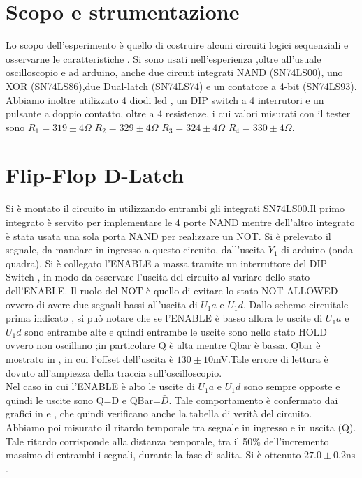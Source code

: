 \section{Scopo e strumentazione}
Lo scopo dell'esperimento è quello di costruire alcuni circuiti logici sequenziali e osservarne le caratteristiche . Si sono usati nell'esperienza ,oltre all'usuale oscilloscopio e ad arduino, anche due circuit integrati NAND (SN74LS00), uno XOR (SN74LS86),due Dual-latch (SN74LS74) e un contatore a 4-bit (SN74LS93). Abbiamo inoltre utilizzato 4 diodi led , un DIP switch a 4 interrutori e un pulsante a doppio contatto, oltre a 4 resistenze, i cui valori misurati con il tester sono $R_1=319 \pm 4\Omega$ $R_2=329\pm 4 \Omega$ $R_3=324\pm 4 \Omega$ $R_4=330\pm 4 \Omega$.


\section{Flip-Flop D-Latch}
Si è montato il circuito in  utilizzando entrambi gli integrati SN74LS00.Il primo integrato è servito per implementare le 4 porte NAND mentre dell'altro integrato è stata usata una sola porta NAND per realizzare un NOT. Si è prelevato il segnale, da mandare in ingresso a questo circuito, dall'uscita $Y_1$ di arduino (onda quadra). Si è collegato l'ENABLE a massa tramite un interruttore del DIP Switch , in modo da osservare l'uscita del circuito al variare dello stato dell'ENABLE. Il ruolo del NOT è quello di evitare lo stato NOT-ALLOWED ovvero di avere due segnali bassi all'uscita di $U_1a$ e $U_1d$. Dallo schemo circuitale prima indicato , si può notare che se l'ENABLE è basso allora le uscite di $U_1a$ e $U_1d$ sono entrambe alte e quindi entrambe le uscite sono nello stato HOLD ovvero non oscillano ;in particolare Q è alta mentre Qbar è bassa. Qbar è mostrato in , in cui l'offset dell'uscita è $130 \pm10$mV.Tale errore di lettura è dovuto all'ampiezza della traccia sull'oscilloscopio.  \\
Nel caso in cui l'ENABLE è alto le uscite di $U_1a$ e $U_1d$ sono sempre opposte e quindi le uscite sono Q=D e QBar=$\bar{D}$. 
Tale comportamento è confermato dai grafici in  e , che quindi verificano anche la tabella di verità del circuito.\\
Abbiamo poi misurato il ritardo temporale tra segnale in ingresso e in uscita (Q). Tale ritardo corrisponde alla distanza temporale, tra il 50\% dell'incremento massimo di entrambi i segnali, durante la fase di salita. Si è ottenuto $27.0 \pm 0.2$ns .
